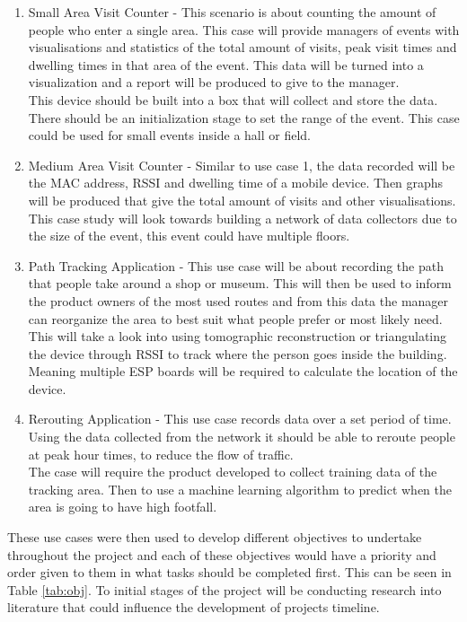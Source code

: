 \documentclass{report}
\begin{document}
\begin{enumerate}
    \item Small Area Visit Counter - This scenario is about counting the amount of people who enter a single area. This case will provide managers of events with visualisations and statistics of the total amount of visits, peak visit times and dwelling times in that area of the event. This data will be turned into a visualization and a report will be produced to give to the manager. \\ \newline
    This device should be built into a box that will collect and store the data. There should be an initialization stage to set the range of the event. This case could be used for small events inside a hall or field. 
    \clearpage
    \item Medium Area Visit Counter - Similar to use case 1, the data recorded will be the MAC address, RSSI and dwelling time of a mobile device. Then graphs will be produced that give the total amount of visits and other visualisations. This case study will look towards building a network of data collectors due to the size of the event, this event could have multiple floors.
    \item Path Tracking Application - This use case will be about recording the path that people take around a shop or museum. This will then be used to inform the product owners of the most used routes and from this data the manager can reorganize the area to best suit what people prefer or most likely need.\\ \newline
    This will take a look into using tomographic reconstruction\cite{tomography} or triangulating the device through RSSI\cite{RSSI} to track where the person goes inside the building. Meaning multiple ESP boards will be required to calculate the location of the device.
    \item Rerouting Application - This use case records data over a set period of time. Using the data collected from the network it should be able to reroute people at peak hour times, to reduce the flow of traffic. \\ \newline
    The case will require the product developed to collect training data of the tracking area. Then to use a machine learning algorithm to predict when the area is going to have high footfall.
\end{enumerate}{}
These use cases were then used to develop different objectives to undertake throughout the project and each of these objectives would have a priority and order given to them in what tasks should be completed first. This can be seen in Table \ref{tab:obj}. To initial stages of the project will be conducting research into literature that could influence the development of projects timeline.
\end{document}

